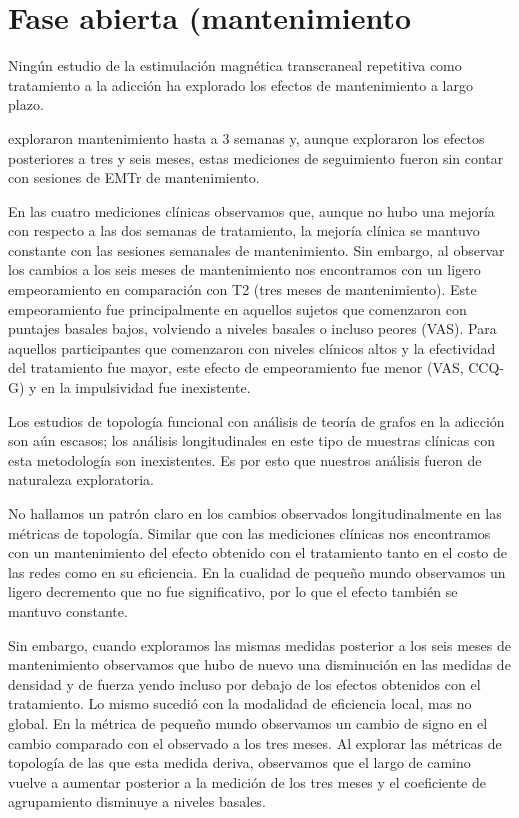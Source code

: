 \section{Fase abierta (mantenimiento}
Ningún estudio de la estimulación magnética transcraneal repetitiva como tratamiento a la adicción ha explorado los efectos de mantenimiento a largo plazo.\par
\textcite{Terraneo2016} exploraron mantenimiento hasta a 3 semanas y, aunque \textcite{Bolloni2016} exploraron los efectos posteriores a tres y seis meses, estas mediciones de seguimiento  fueron sin contar con sesiones de EMTr de mantenimiento.\par
En las cuatro mediciones clínicas observamos que, aunque no hubo una mejoría con respecto a las dos semanas de tratamiento, la mejoría clínica se mantuvo constante con las sesiones semanales de mantenimiento.
Sin embargo, al observar los cambios a los seis meses de mantenimiento nos encontramos con un ligero empeoramiento en comparación con T2 (tres meses de mantenimiento). Este empeoramiento fue principalmente en aquellos sujetos que comenzaron con puntajes basales bajos, volviendo a niveles basales o incluso peores (VAS). Para aquellos participantes que comenzaron con niveles clínicos altos y la efectividad del tratamiento fue mayor, este efecto de empeoramiento fue menor (VAS, CCQ-G) y en la impulsividad fue inexistente.

Los estudios de topología funcional con análisis de teoría de grafos en la adicción son aún escasos; los análisis longitudinales en este tipo de muestras clínicas con esta metodología son inexistentes. Es por esto que nuestros análisis fueron de naturaleza exploratoria.\par
No hallamos un patrón claro en los cambios observados longitudinalmente en las métricas de topología. Similar que con las mediciones clínicas nos encontramos con un mantenimiento del efecto obtenido con el tratamiento tanto en el costo de las redes como en su eficiencia. En la cualidad de pequeño mundo observamos un ligero decremento que no fue significativo, por lo que el efecto también se mantuvo constante. \par
Sin embargo, cuando exploramos las mismas medidas posterior a los seis meses de mantenimiento observamos que hubo de nuevo una disminución en las medidas de densidad y de fuerza yendo incluso por debajo de los efectos obtenidos con el tratamiento. Lo mismo sucedió con la modalidad de eficiencia local, mas no global. En la métrica de pequeño mundo observamos un cambio de signo en el cambio comparado con el observado a los tres meses. Al explorar las métricas de topología de las que esta medida deriva, observamos que el largo de camino vuelve a aumentar posterior a la medición de los tres meses y el coeficiente de agrupamiento disminuye a niveles basales. \par

